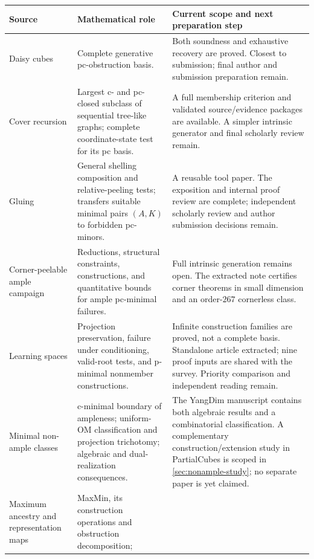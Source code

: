 \documentclass[11pt]{article}
\theoremstyle{definition}
\begin{document}
\small
\begin{longtable}{@{}>{\raggedright\arraybackslash}p{}
 >{\raggedright\arraybackslash}p{}
 >{\raggedright\arraybackslash}p{}@{}}
\toprule
Source & Mathematical role & Current scope and next preparation step\\
\midrule\endhead
Daisy cubes \cite{Daisy}
& Complete generative pc-obstruction basis.
& Both soundness and exhaustive recovery are proved. Closest to submission;
final author and submission preparation remain.\\[5pt]
Cover recursion \cite{Cover}
& Largest c- and pc-closed subclass of sequential tree-like graphs; complete
coordinate-state test for its pc basis.
& A full membership criterion and validated source/evidence packages are
available. A simpler intrinsic generator and final scholarly review remain.\\[5pt]
Gluing \cite{Gluing}
& General shelling composition and relative-peeling tests; transfers suitable
minimal pairs $(A,K)$ to forbidden pc-minors.
& A reusable tool paper. The exposition and internal proof review are complete;
independent scholarly review and author submission decisions remain.\\[5pt]
Corner-peelable ample campaign \cite{AmpleCampaign}
& Reductions, structural constraints, constructions, and quantitative bounds
for ample pc-minimal failures.
& Full intrinsic generation remains open. The extracted note \cite{AmpleCorners}
certifies corner theorems in small dimension and an order-$267$ cornerless class.\\[5pt]
Learning spaces \cite{Learning,Survey}
& Projection preservation, failure under conditioning, valid-root tests,
and p-minimal nonmember constructions.
& Infinite construction families are proved, not a complete basis.
Standalone article extracted; nine proof inputs are shared with the survey.
Priority comparison and independent reading remain.\\[5pt]
Minimal non-ample classes \cite{MNA}
& c-minimal boundary of ampleness; uniform-OM classification and projection
trichotomy; algebraic and dual-realization consequences.
& The YangDim manuscript contains both algebraic results and a combinatorial
classification. A complementary construction/extension study in PartialCubes
is scoped in \cref{sec:nonample-study}; no separate paper is yet claimed.\\[5pt]
Maximum ancestry and representation maps \cite{Partition,MaxSections}
& MaxMin, its construction operations and obstruction decomposition;

\end{longtable}
\end{document}
